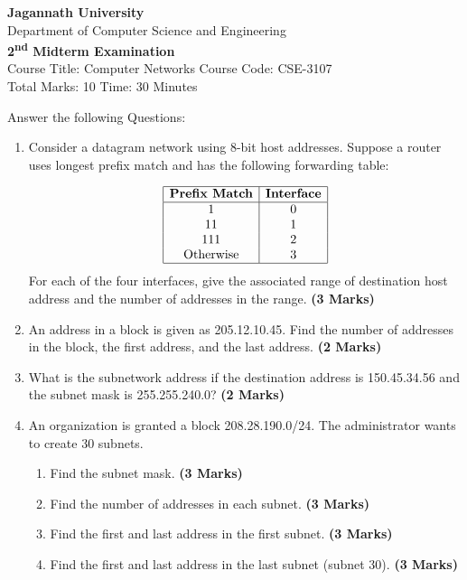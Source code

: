 \documentclass{article}
\begin{document}
\begin{center}
    \textbf{Jagannath University} \\
    Department of Computer Science and Engineering \\
    \textbf{2\textsuperscript{nd} Midterm Examination} \\
    Course Title: Computer Networks \hspace{0.2cm} Course Code: CSE-3107 \\
    Total Marks: 10 \hspace{0.2cm} Time: 30 Minutes
\end{center}

\noindent Answer the following Questions:

\begin{enumerate}
    \item Consider a datagram network using 8-bit host addresses. Suppose a router uses longest prefix match and has the following forwarding table:
    
    \[
    \begin{array}{|c|c|}
    \hline
    \textbf{Prefix Match} & \textbf{Interface} \\
    \hline
    1 & 0 \\
    11 & 1 \\
    111 & 2 \\
    \text{Otherwise} & 3 \\
    \hline
    \end{array}
    \]
    For each of the four interfaces, give the associated range of destination host address and the number of addresses in the range. \hspace{1cm} \textbf{(3 Marks)}
    
    \item An address in a block is given as 205.12.10.45. Find the number of addresses in the block, the first address, and the last address. \hspace{1cm} \textbf{(2 Marks)}
    
    \item What is the subnetwork address if the destination address is 150.45.34.56 and the subnet mask is 255.255.240.0? \hspace{1cm} \textbf{(2 Marks)}
    
    \item An organization is granted a block 208.28.190.0/24. The administrator wants to create 30 subnets.
    \begin{enumerate}
        \item Find the subnet mask. \hspace{1cm} \textbf{(3 Marks)}
        \item Find the number of addresses in each subnet. \hspace{1cm} \textbf{(3 Marks)}
        \item Find the first and last address in the first subnet. \hspace{1cm} \textbf{(3 Marks)}
        \item Find the first and last address in the last subnet (subnet 30). \hspace{1cm} \textbf{(3 Marks)}
    \end{enumerate}
\end{enumerate}
\end{document}
